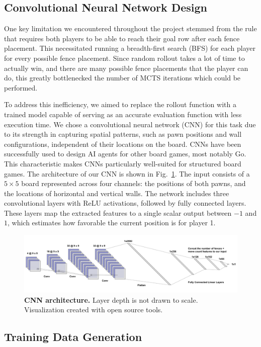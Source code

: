 \documentclass[10pt]{article}
\begin{document}
\subsection{Convolutional Neural Network Design}
One key limitation we encountered throughout the project stemmed from the rule that requires both players to be able to reach their goal row after each fence placement. This necessitated running a breadth-first search (BFS) for each player for every possible fence placement. Since random rollout takes a lot of time to actually win, and there are many possible fence placements that the player can do, this greatly bottlenecked the number of MCTS iterations which could be performed.

To address this inefficiency, we aimed to replace the rollout function with a trained model capable of serving as an accurate evaluation function with less execution time. We chose a convolutional neural network (CNN) for this task due to its strength in capturing spatial patterns, such as pawn positions and wall configurations, independent of their locations on the board. CNNs have been successfully used to design AI agents for other board games, most notably Go.\cite{silver2016go} This characteristic makes CNNs particularly well-suited for structured board games. The architecture of our CNN is shown in Fig.~\ref{fig:cnn_arch}. The input consists of a $5 \times 5$ board represented across four channels: the positions of both pawns, and the locations of horizontal and vertical walls. The network includes three convolutional layers with ReLU activations, followed by fully connected layers. These layers map the extracted features to a single scalar output between $-1$ and $1$, which estimates how favorable the current position is for player 1.

\begin{figure}[H]
    \centering
    \includegraphics[width=\linewidth]{cnn_arch.png}
    \caption{\textbf{CNN architecture.} Layer depth is not drawn to scale. Visualization created with open source tools.\cite{lenail2019nnsvg}}
    \label{fig:cnn_arch}
\end{figure}
\subsection{Training Data Generation}
\end{document}
